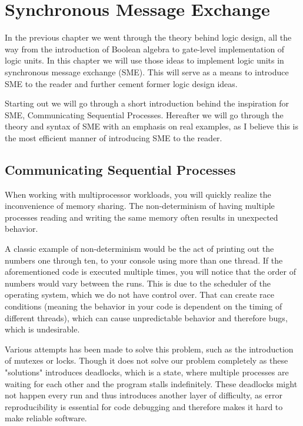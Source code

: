 \chapter{Synchronous Message Exchange}

In the previous chapter we went through the theory behind logic design, all the way from the introduction of Boolean algebra to gate-level implementation of logic units. In this chapter we will use those ideas to implement logic units in synchronous message exchange (SME). This will serve as a means to introduce SME to the reader and further cement former logic design ideas.

Starting out we will go through a short introduction behind the inspiration for SME, Communicating Sequential Processes. Hereafter we will go through the theory and syntax of SME with an emphasis on real examples, as I believe this is the most efficient manner of introducing SME to the reader.  

\section{Communicating Sequential Processes}
    
    When working with multiprocessor workloads, you will quickly realize the inconvenience of memory sharing. The non-determinism of having multiple processes reading and writing the same memory often results in unexpected behavior.
    
    A classic example of non-determinism would be the act of printing out the numbers one through ten, to your console using more than one thread. If the aforementioned code is executed multiple times, you will notice that the order of numbers would vary between the runs. This is due to the scheduler of the operating system, which we do not have control over. That can create race conditions (meaning the behavior in your code is dependent on the timing of different threads), which can cause unpredictable behavior and therefore bugs, which is undesirable.
    
    Various attempts has been made to solve this problem, such as the introduction of mutexes or locks. Though it does not solve our problem completely as these "solutions" introduces deadlocks, which is a state, where multiple processes are waiting for each other and the program stalls indefinitely. These deadlocks might not happen every run and thus introduces another layer of difficulty, as error reproducibility is essential for code debugging and therefore makes it hard to make reliable software.
    

